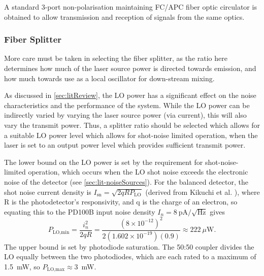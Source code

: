  A standard 3-port non-polarisation maintaining FC/APC fiber optic circulator is obtained to allow transmission and reception of signals from the same optics. 
\subsubsection{Fiber Splitter}
 More care must be taken in selecting the fiber splitter, as the ratio here determines how much of the laser source power is directed towards emission, and how much towards use as a local oscillator for down-stream mixing.
 
  As discussed in \autoref{sec:litReview}, the LO power has a significant effect on the noise characteristics and the performance of the system. While the LO power can be indirectly varied by varying the laser source power (via current), this will also vary the transmit power. Thus, a splitter ratio should be selected which allows for a suitable LO power level which allows for shot-noise limited operation, when the laser is set to an output power level which provides sufficient transmit power. 
 
 The lower bound on the LO power is set by the requirement for shot-noise-limited
 operation, which occurs when the LO shot noise exceeds the 
 electronic noise of the detector (see \autoref{sec:lit-noiseSources}). For the
 balanced detector, the shot noise current density is
 $I_{\text{sn}} = \sqrt{2qR P_{\text{LO}}}$ (derived from Kikuchi et al. \cite{kikuchi_fundamentals_2016}), where R is the photodetector's responsivity, and q is the charge of an electron, so equating this to the PD100B input
 noise density $I_n = 8~\text{pA}/\sqrt{\text{Hz}}$ gives
 \begin{equation}
 	P_{\text{LO,min}} = \frac{i_n^2}{2qR}
 	= \frac{(8\times10^{-12})^2}{2(1.602\times10^{-19})(0.9)}
 	\approx 222~\mu\text{W}.
 	\label{eq:PLOmin}
 \end{equation}
 The upper bound is set by photodiode saturation. The 50:50 coupler divides the
 LO equally between the two photodiodes, which are each rated to a maximum of 1.5~mW, so
 $P_{\text{LO,max}} \approx 3$~mW.
 
